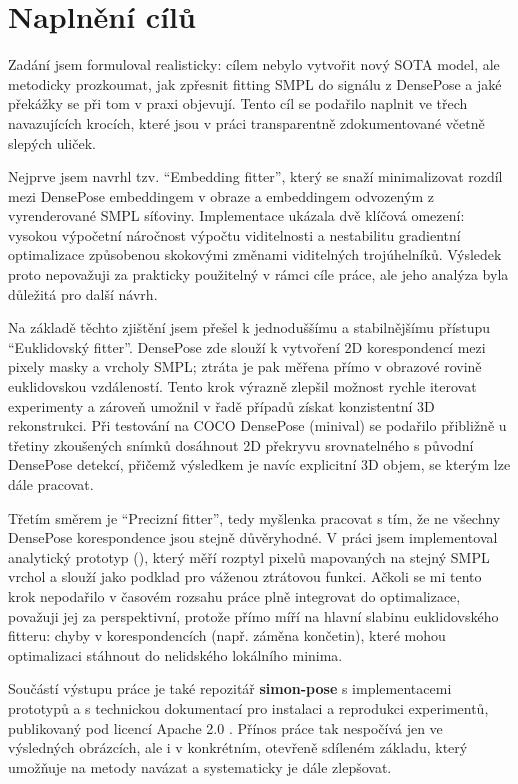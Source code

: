 \documentclass[11pt,a4paper,twoside,openright]{report}
\begin{document}
\section{Naplnění cílů}

Zadání jsem formuloval realisticky: cílem nebylo vytvořit nový SOTA model, ale metodicky prozkoumat, jak zpřesnit fitting SMPL do signálu z DensePose a jaké překážky se při tom v praxi objevují. Tento cíl se podařilo naplnit ve třech navazujících krocích, které jsou v práci transparentně zdokumentované včetně slepých uliček.

Nejprve jsem navrhl tzv. \enquote{Embedding fitter}, který se snaží minimalizovat rozdíl mezi DensePose embeddingem v obraze a embeddingem odvozeným z vyrenderované SMPL síťoviny. Implementace ukázala dvě klíčová omezení: vysokou výpočetní náročnost výpočtu viditelnosti a nestabilitu gradientní optimalizace způsobenou skokovými změnami viditelných trojúhelníků. Výsledek proto nepovažuji za prakticky použitelný v rámci cíle práce, ale jeho analýza byla důležitá pro další návrh.

Na základě těchto zjištění jsem přešel k jednoduššímu a stabilnějšímu přístupu \enquote{Euklidovský fitter}. DensePose zde slouží k vytvoření 2D korespondencí mezi pixely masky a vrcholy SMPL; ztráta je pak měřena přímo v obrazové rovině euklidovskou vzdáleností. Tento krok výrazně zlepšil možnost rychle iterovat experimenty a zároveň umožnil v řadě případů získat konzistentní 3D rekonstrukci. Při testování na COCO DensePose (minival) se podařilo přibližně u třetiny zkoušených snímků dosáhnout 2D překryvu srovnatelného s původní DensePose detekcí, přičemž výsledkem je navíc explicitní 3D objem, se kterým lze dále pracovat.

Třetím směrem je \enquote{Precizní fitter}, tedy myšlenka pracovat s tím, že ne všechny DensePose korespondence jsou stejně důvěryhodné. V práci jsem implementoval analytický prototyp (), který měří rozptyl pixelů mapovaných na stejný SMPL vrchol a slouží jako podklad pro váženou ztrátovou funkci. Ačkoli se mi tento krok nepodařilo v časovém rozsahu práce plně integrovat do optimalizace, považuji jej za perspektivní, protože přímo míří na hlavní slabinu euklidovského fitteru: chyby v korespondencích (např. záměna končetin), které mohou optimalizaci stáhnout do nelidského lokálního minima.

Součástí výstupu práce je také repozitář \textbf{simon-pose} s implementacemi prototypů a s technickou dokumentací pro instalaci a reprodukci experimentů, publikovaný pod licencí Apache 2.0 \cite{apache_license_2_0}. Přínos práce tak nespočívá jen ve výsledných obrázcích, ale i v konkrétním, otevřeně sdíleném základu, který umožňuje na metody navázat a systematicky je dále zlepšovat.
\end{document}
